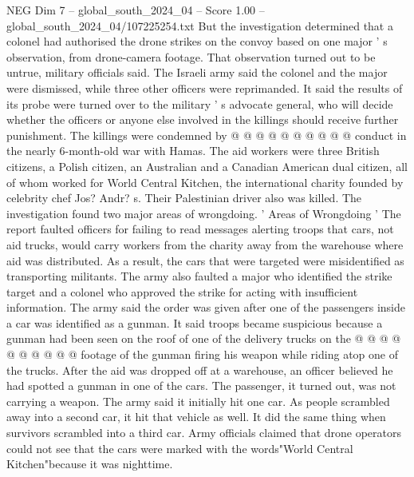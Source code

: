 \begin{textsample}{NEG Dim 7 – global\_south\_2024\_04 – Score 1.00 – global\_south\_2024\_04/107225254.txt}
But the investigation determined that a colonel had authorised the drone strikes on the convoy based on one major ' s observation, from drone-camera footage.
That observation turned out to be untrue, military officials said.
The Israeli army said the colonel and the major were dismissed, while three other officers were reprimanded.
It said the results of its probe were turned over to the military ' s advocate general, who will decide whether the officers or anyone else involved in the killings should receive further punishment.
The killings were condemned by @ @ @ @ @ @ @ @ @ @ conduct in the nearly 6-month-old war with Hamas.
The aid workers were three British citizens, a Polish citizen, an Australian and a Canadian American dual citizen, all of whom worked for World Central Kitchen, the international charity founded by celebrity chef Jos?
Andr? s.
Their Palestinian driver also was killed.
The investigation found two major areas of wrongdoing. ' Areas of Wrongdoing ' The report faulted officers for failing to read messages alerting troops that cars, not aid trucks, would carry workers from the charity away from the warehouse where aid was distributed.
As a result, the cars that were targeted were misidentified as transporting militants.
The army also faulted a major who identified the strike target and a colonel who approved the strike for acting with insufficient information.
The army said the order was given after one of the passengers inside a car was identified as a gunman.
It said troops became suspicious because a gunman had been seen on the roof of one of the delivery trucks on the @ @ @ @ @ @ @ @ @ @ footage of the gunman firing his weapon while riding atop one of the trucks.
After the aid was dropped off at a warehouse, an officer believed he had spotted a gunman in one of the cars.
The passenger, it turned out, was not carrying a weapon.
The army said it initially hit one car.
As people scrambled away into a second car, it hit that vehicle as well.
It did the same thing when survivors scrambled into a third car.
Army officials claimed that drone operators could not see that the cars were marked with the words"World Central Kitchen"because it was nighttime.

\end{textsample}
